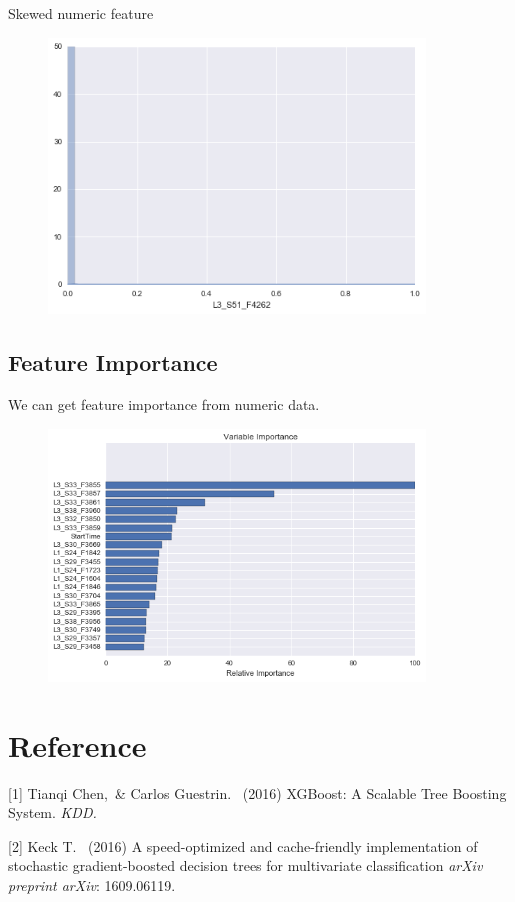 \documentclass{article}
\begin{document}
Skewed numeric feature
\begin{figure}[h]
\includegraphics[width=10cm]{L3_S51_F4262.png}
\end{figure}

\subsection{Feature Importance}
We can get feature importance from numeric data.
\begin{figure}[h]
\includegraphics[width=10cm]{featureImportance.png}
\end{figure}

\section{Reference}


[1] Tianqi Chen,\ \& Carlos Guestrin. \ (2016) XGBoost: A Scalable Tree Boosting System. {\it KDD.}

[2] Keck T. \ (2016) A speed-optimized and cache-friendly implementation of stochastic gradient-boosted decision trees for multivariate classification {\it arXiv preprint arXiv}: 1609.06119.
\end{document}
